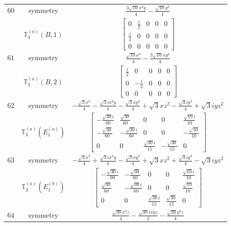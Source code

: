 \documentclass[fleqn,8pt,landscape]{jsarticle}
\begin{document}
\begin{longtable}{ccc}
$ 60 $ & $ \text{symmetry} $ & $ \frac{3 \sqrt{10} x^{2} y}{4} - \frac{\sqrt{10} y^{3}}{4} $ \\
$  $ & $ \mathbb{T}_{3}^{(a)}(B,1) $ & $ \begin{bmatrix} 0 & \frac{i}{2} & 0 & 0 & 0 \\ \frac{i}{2} & 0 & 0 & 0 & 0 \\ 0 & 0 & 0 & 0 & 0 \end{bmatrix} $ \\ \hline
$ 61 $ & $ \text{symmetry} $ & $ \frac{\sqrt{10} x^{3}}{4} - \frac{3 \sqrt{10} x y^{2}}{4} $ \\
$  $ & $ \mathbb{T}_{3}^{(a)}(B,2) $ & $ \begin{bmatrix} \frac{i}{2} & 0 & 0 & 0 & 0 \\ 0 & - \frac{i}{2} & 0 & 0 & 0 \\ 0 & 0 & 0 & 0 & 0 \end{bmatrix} $ \\ \hline
$ 62 $ & $ \text{symmetry} $ & $ - \frac{\sqrt{3} x^{3}}{4} - \frac{\sqrt{3} i x^{2} y}{4} - \frac{\sqrt{3} x y^{2}}{4} + \sqrt{3} x z^{2} - \frac{\sqrt{3} i y^{3}}{4} + \sqrt{3} i y z^{2} $ \\
$  $ & $ \mathbb{T}_{3}^{(a)}(E_{1}^{(a)}) $ & $ \begin{bmatrix} - \frac{\sqrt{30} i}{60} & \frac{\sqrt{30}}{60} & 0 & 0 & \frac{\sqrt{10} i}{10} \\ - \frac{\sqrt{30}}{60} & - \frac{\sqrt{30} i}{60} & 0 & 0 & - \frac{\sqrt{10}}{10} \\ 0 & 0 & \frac{\sqrt{30} i}{15} & - \frac{\sqrt{30}}{15} & 0 \end{bmatrix} $ \\ \hline
$ 63 $ & $ \text{symmetry} $ & $ - \frac{\sqrt{3} x^{3}}{4} + \frac{\sqrt{3} i x^{2} y}{4} - \frac{\sqrt{3} x y^{2}}{4} + \sqrt{3} x z^{2} + \frac{\sqrt{3} i y^{3}}{4} - \sqrt{3} i y z^{2} $ \\
$  $ & $ \mathbb{T}_{3}^{(a)}(E_{1}^{(b)}) $ & $ \begin{bmatrix} - \frac{\sqrt{30} i}{60} & - \frac{\sqrt{30}}{60} & 0 & 0 & \frac{\sqrt{10} i}{10} \\ \frac{\sqrt{30}}{60} & - \frac{\sqrt{30} i}{60} & 0 & 0 & \frac{\sqrt{10}}{10} \\ 0 & 0 & \frac{\sqrt{30} i}{15} & \frac{\sqrt{30}}{15} & 0 \end{bmatrix} $ \\ \hline
$ 64 $ & $ \text{symmetry} $ & $ \frac{\sqrt{30} x^{2} z}{4} - \frac{\sqrt{30} i x y z}{2} - \frac{\sqrt{30} y^{2} z}{4} $ \\

\end{longtable}
\end{document}

